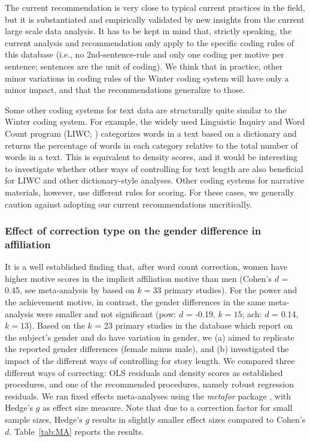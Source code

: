 \documentclass[jou,a4paper]{apa6}\usepackage[]{graphicx}\usepackage[]{color}
\begin{document}
The current recommendation is very close to typical current practices in the field, but it is substantiated and empirically validated by new insights from the current large scale data analysis. It has to be kept in mind that, strictly speaking, the current analysis and recommendation only apply to the specific coding rules of this database (i.e., no 2nd-sentence-rule and only one coding per motive per sentence; sentences are the unit of coding). We think that in practice, other minor variations in coding rules of the Winter coding system will have only a minor impact, and that the recommendations generalize to those.

Some other coding systems for text data are structurally quite similar to the Winter coding system. For example, the widely used Linguistic Inquiry and Word Count program (LIWC; ) categorizes words in a text based on a dictionary and returns the percentage of words in each category relative to the total number of words in a text. This is equivalent to density scores, and it would be interesting to investigate whether other ways of controlling for text length are also beneficial for LIWC and other dictionary-style analyses. Other coding systems for narrative materials, however, use different rules for scoring. For these cases, we generally caution against adopting our current recommendations uncritically.



\subsubsection{Effect of correction type on the gender difference in affiliation}
It is a well established finding that, after word count correction, women have higher motive scores in the implicit affiliation motive than men (Cohen's $d$ = 0.45, see meta-analysis by  based on $k = 33$ primary studies). 
For the power and the achievement motive, in contrast, the gender differences in the same meta-analysis were smaller and not significant (pow: $d$ = -0.19, $k = 15$; ach: $d$ = 0.14, $k = 13$).
Based on the $k$ = 23 primary studies in the database which report on the subject's gender and do have variation in gender, we (a) aimed to replicate the reported gender differences (female minus male), and (b) investigated the impact of the different ways of controlling for story length.
We compared three different ways of correcting: OLS residuals and density scores as established procedures, and one of the recommended procedures, namely robust regression residuals. We ran fixed effects meta-analyses using the \emph{metafor} package \parencite{viechtbauer_conducting_2010}, with Hedge's $g$ as effect size measure. Note that due to a correction factor for small sample sizes, Hedge's $g$ results in slightly smaller effect sizes compared to Cohen's $d$. Table~\ref{tab:MA} reports the results.
\end{document}
